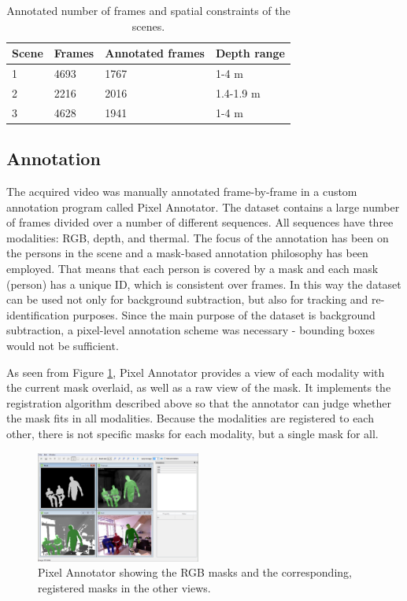 \documentclass[10pt,twocolumn,letterpaper]{article}
\begin{document}
\begin{table}[htpb]
\centering
\begin{tabular}{llll}
\hline
Scene & Frames 	& Annotated frames 	& Depth range \\ \hline
1 		& 4693		& 1767	 						& 1-4 m \\
2 		& 2216		& 2016	 						& 1.4-1.9 m \\
3 		& 4628		& 1941	 						& 1-4 m \\ 
\hline
\end{tabular}
\caption{Annotated number of frames and spatial constraints of the scenes.}
\label{tab:scenes}
\end{table}

\subsection{Annotation}
%
The acquired video was manually annotated frame-by-frame in a custom annotation program called Pixel Annotator. The dataset contains a large number of frames divided over a number of different sequences. All sequences have three modalities: RGB, depth, and thermal. The focus of the annotation has been on the persons in the scene and a mask-based annotation philosophy has been employed. That means that each person is covered by a mask and each mask (person) has a unique ID, which is consistent over frames. In this way the dataset can be used not only for background subtraction, but also for tracking and re-identification purposes. Since the main purpose of the dataset is background subtraction, a pixel-level annotation scheme was necessary - bounding boxes would not be sufficient.
 
As seen from Figure \ref{fig:pixelannotator}, Pixel Annotator provides a view of each modality with the current mask overlaid, as well as a raw view of the mask. It implements the registration algorithm described above so that the annotator can judge whether the mask fits in all modalities. Because the modalities are registered to each other, there is not specific masks for each modality, but a single mask for all.

\begin{figure}%
\includegraphics[width=0.48\textwidth]{pixelannotator2.png}%
\caption{Pixel Annotator showing the RGB masks and the corresponding, registered masks in the other views.}%
\label{fig:pixelannotator}%
\end{figure}
\end{document}
